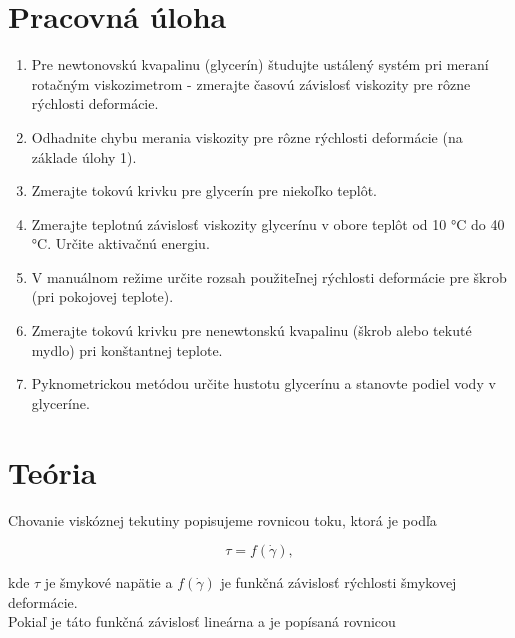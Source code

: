 \documentclass{prepareprotokol} %
\begin{document}
	\maketitle
	\let\oldref\ref
	\renewcommand{\ref}[1]{(\oldref{#1})}
	\newcommand{\Nm}{$\mbox{N}\cdot\mbox{m}^{-2}$}
	\newcommand{\ms}{$\mbox{m}\cdot\mbox{s}^{-2}$}
	\newcommand{\kgm}{$\mbox{kg}\cdot\mbox{m}^{-3}$}
	
	
\section*{Pracovná úloha}
\begin{enumerate}
\item Pre newtonovskú kvapalinu (glycerín) študujte ustálený systém pri meraní rotačným viskozimetrom - zmerajte časovú závislosť viskozity pre rôzne rýchlosti deformácie.
\item Odhadnite chybu merania viskozity pre rôzne rýchlosti deformácie (na základe úlohy 1).
\item Zmerajte tokovú krivku pre glycerín pre niekoľko teplôt.
\item Zmerajte teplotnú závislosť viskozity glycerínu v obore teplôt od 10 °C do 40 °C. Určite aktivačnú energiu.
\item V manuálnom režime určite rozsah použiteľnej rýchlosti deformácie pre škrob (pri pokojovej teplote).
\item Zmerajte tokovú krivku pre nenewtonskú kvapalinu (škrob alebo tekuté mydlo) pri konštantnej teplote.
\item Pyknometrickou metódou určite hustotu glycerínu a stanovte podiel vody v glyceríne.
\end{enumerate}
	
\section*{Teória}
        
Chovanie viskóznej tekutiny popisujeme rovnicou toku, ktorá je podľa \cite{Študijný text}

\begin{equation}
		\tau = f(\dot{\gamma}),
		\label{eq:RovnicaToku}
\end{equation} 

kde $\tau$ je šmykové napätie a $f(\dot{\gamma})$ je funkčná závislosť rýchlosti šmykovej deformácie.\\

Pokiaľ je táto funkčná závislosť lineárna a je popísaná rovnicou
\end{document}
